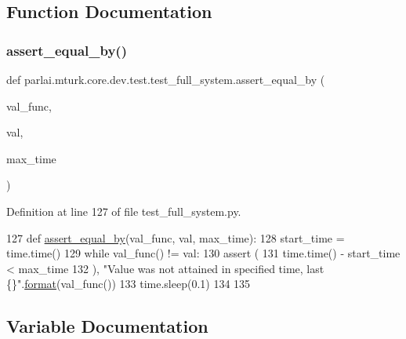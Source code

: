 \subsection{Function Documentation}
\mbox{\label{namespaceparlai_1_1mturk_1_1core_1_1dev_1_1test_1_1test__full__system_a08d3f9d5e50fd752ba609ce51013e4ce}} 
\subsubsection{\texorpdfstring{assert\+\_\+equal\+\_\+by()}{assert\_equal\_by()}}
{\footnotesize\ttfamily def parlai.\+mturk.\+core.\+dev.\+test.\+test\+\_\+full\+\_\+system.\+assert\+\_\+equal\+\_\+by (\begin{DoxyParamCaption}\item[{}]{val\+\_\+func,  }\item[{}]{val,  }\item[{}]{max\+\_\+time }\end{DoxyParamCaption})}



Definition at line 127 of file test\+\_\+full\+\_\+system.\+py.


\begin{DoxyCode}
127 \textcolor{keyword}{def }\hyperlink{namespaceparlai_1_1mturk_1_1core_1_1test_1_1test__full__system_a0b463246d35658a2e422010f13dcf819}{assert\_equal\_by}(val\_func, val, max\_time):
128     start\_time = time.time()
129     \textcolor{keywordflow}{while} val\_func() != val:
130         \textcolor{keyword}{assert} (
131             time.time() - start\_time < max\_time
132         ), \textcolor{stringliteral}{"Value was not attained in specified time, last \{\}"}.\hyperlink{namespaceparlai_1_1chat__service_1_1services_1_1messenger_1_1shared__utils_a32e2e2022b824fbaf80c747160b52a76}{format}(val\_func())
133         time.sleep(0.1)
134 
135 
\end{DoxyCode}


\subsection{Variable Documentation}
\mbox{\label{namespaceparlai_1_1mturk_1_1core_1_1dev_1_1test_1_1test__full__system_a64887c1d71a85594217bdf489c62a085}} 
